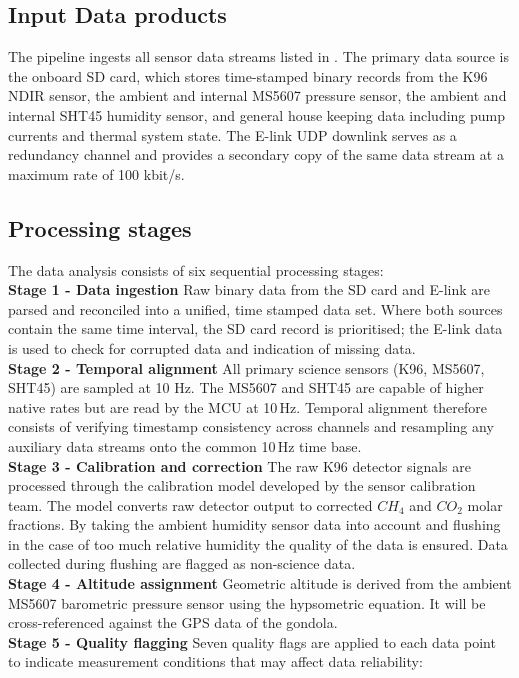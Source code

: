 \subsection*{Input Data products}
The pipeline ingests all sensor data streams listed in . The primary data source is the onboard SD card, which stores time-stamped binary records from the K96 NDIR sensor, the ambient and internal MS5607 pressure sensor, the ambient and internal SHT45 humidity sensor, and general house keeping data including pump currents and thermal system state. The E-link UDP downlink serves as a redundancy channel and provides a secondary copy of the same data stream at a maximum rate of 100 kbit/s. 

\subsection*{Processing stages}

The data analysis consists of six sequential processing stages:\\
\textbf{Stage 1 - Data ingestion} Raw binary data from the SD card and E-link are parsed and reconciled into a unified, time stamped data set. Where both sources contain the same time interval, the SD card record is prioritised; the E-link data is used to check for corrupted data and indication of missing data.\\
\textbf{Stage 2 - Temporal alignment} All primary science sensors (K96, MS5607, SHT45) are sampled at 10 Hz. The MS5607 and SHT45 are capable of higher native rates but are read by the MCU at 10\,Hz. Temporal alignment therefore consists of verifying timestamp consistency across channels and resampling any auxiliary data streams onto the common 10\,Hz time base. \\
\textbf{Stage 3 - Calibration and correction} The raw K96 detector signals are processed through the calibration model developed by the sensor calibration team. The model converts raw detector output to corrected $CH_4$ and $CO_2$ molar fractions. By taking the ambient humidity sensor data into account and flushing in the case of too much relative humidity the quality of the data is ensured. Data collected during flushing are flagged as non-science data. \\
\textbf{Stage 4 - Altitude assignment} Geometric altitude is derived from the ambient MS5607 barometric pressure sensor using the hypsometric equation. It will be cross-referenced against the GPS data of the gondola.\\ 
\textbf{Stage 5 - Quality flagging} Seven quality flags are applied to each data point to indicate measurement conditions that may affect data reliability:

